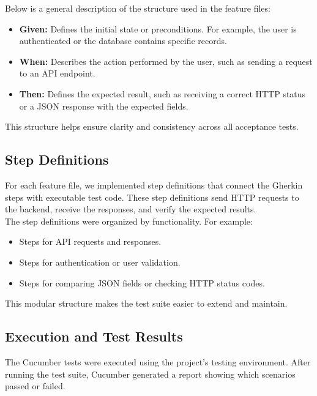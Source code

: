 \documentclass[12pt,a4paper]{article}
\begin{document}
Below is a general description of the structure used in the feature files:

\begin{itemize}
	\item \textbf{Given:} Defines the initial state or preconditions. For example, the user is authenticated or the database contains specific records.
	\item \textbf{When:} Describes the action performed by the user, such as sending a request to an API endpoint.
	\item \textbf{Then:} Defines the expected result, such as receiving a correct HTTP status or a JSON response with the expected fields.
\end{itemize}

This structure helps ensure clarity and consistency across all acceptance tests.

\subsection{Step Definitions}

For each feature file, we implemented step definitions that connect the Gherkin steps with executable test code. These step definitions send HTTP requests to the backend, receive the responses, and verify the expected results.\\ 

The step definitions were organized by functionality. For example:

\begin{itemize}
	\item Steps for API requests and responses.
	\item Steps for authentication or user validation.
	\item Steps for comparing JSON fields or checking HTTP status codes.
\end{itemize}

This modular structure makes the test suite easier to extend and maintain.

\subsection{Execution and Test Results}

The Cucumber tests were executed using the project's testing environment. After running the test suite, Cucumber generated a report showing which scenarios passed or failed.\\ 
\end{document}
